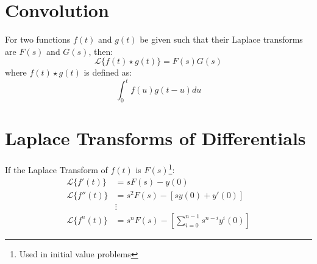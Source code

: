 \section{Convolution}
For two functions $f(t)$ and $g(t)$ be given such that their Laplace transforms are $F(s)$ and $G(s)$, then:
\begin{equation}
	\mathcal{L}\lbrace f(t) \star g(t) \rbrace=F(s)G(s)
\end{equation}
where $f(t) \star g(t)$ is defined as:
\begin{equation}
	\int_0^t f(u)g(t-u)du
\end{equation}

\section{Laplace Transforms of Differentials}
If the Laplace Transform of $f(t)$ is $F(s)$\footnote{Used in initial value problems}:
\begin{align}
	\mathcal{L}\lbrace f'(t) \rbrace & =sF(s)-y(0)\\
	\mathcal{L}\lbrace f''(t) \rbrace & = s^2 F(s)-[s y(0)+y'(0)]\\
	&\vdots\nonumber\\
	\mathcal{L}\lbrace f^n(t) \rbrace & = s^n F(s)-[\sum_{i=0}^{n-1}s^{n-i}y^i(0)]
\end{align}

